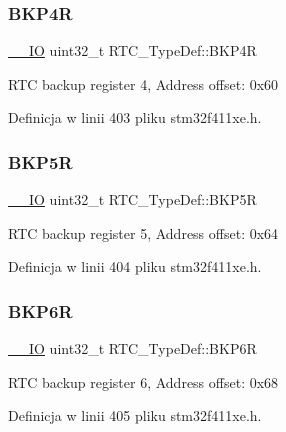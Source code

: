 \subsubsection{\texorpdfstring{B\+K\+P4R}{BKP4R}}
{\footnotesize\ttfamily \hyperlink{core__sc300_8h_aec43007d9998a0a0e01faede4133d6be}{\+\_\+\+\_\+\+IO} uint32\+\_\+t R\+T\+C\+\_\+\+Type\+Def\+::\+B\+K\+P4R}

R\+TC backup register 4, Address offset\+: 0x60 

Definicja w linii 403 pliku stm32f411xe.\+h.

\mbox{\label{struct_r_t_c___type_def_a0f3a33de81247ec5729e400a1261f917}} 
\subsubsection{\texorpdfstring{B\+K\+P5R}{BKP5R}}
{\footnotesize\ttfamily \hyperlink{core__sc300_8h_aec43007d9998a0a0e01faede4133d6be}{\+\_\+\+\_\+\+IO} uint32\+\_\+t R\+T\+C\+\_\+\+Type\+Def\+::\+B\+K\+P5R}

R\+TC backup register 5, Address offset\+: 0x64 

Definicja w linii 404 pliku stm32f411xe.\+h.

\mbox{\label{struct_r_t_c___type_def_a766e2071c5826e3a299ae1cd5bbf06f7}} 
\subsubsection{\texorpdfstring{B\+K\+P6R}{BKP6R}}
{\footnotesize\ttfamily \hyperlink{core__sc300_8h_aec43007d9998a0a0e01faede4133d6be}{\+\_\+\+\_\+\+IO} uint32\+\_\+t R\+T\+C\+\_\+\+Type\+Def\+::\+B\+K\+P6R}

R\+TC backup register 6, Address offset\+: 0x68 

Definicja w linii 405 pliku stm32f411xe.\+h.

\mbox{\label{struct_r_t_c___type_def_a9934af6ae6b3f5660204d48ceb2f3192}} 
